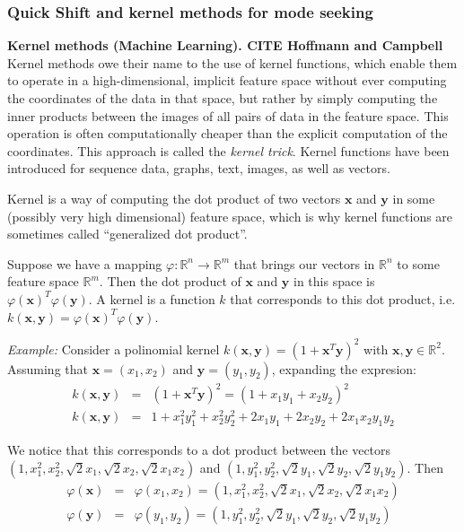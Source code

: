 \subsubsection{Quick Shift and kernel methods for mode seeking}
\begin{description}
 \item \textbf{Kernel methods (Machine Learning). CITE Hoffmann and Campbell } Kernel methods owe their name to the use of kernel functions, which enable them to operate in a high-dimensional, implicit feature space without ever computing the coordinates of the data in that space, but rather by simply computing the inner products between the images of all pairs of data in the feature space. This operation is often computationally cheaper than the explicit computation of the coordinates. This approach is called the \textit{kernel trick}. Kernel functions have been introduced for sequence data, graphs, text, images, as well as vectors.
 
 Kernel is a way of computing the dot product of two vectors $ \mathbf{x}$ and $ \mathbf{y}$ in some (possibly very high dimensional) feature space, which is why kernel functions are sometimes called ``generalized dot product''.

 Suppose we have a mapping $\varphi:\mathbb{R}^{n}\rightarrow \mathbb{R}^{m}$ that brings our vectors in $\mathbb{R}^{n}$ to some feature space $\mathbb{R}^{m}$. Then the dot product of $ \mathbf{x}$ and $ \mathbf{y}$ in this space is $\varphi( \mathbf{x})^{T}\varphi( \mathbf{y})$. A kernel is a function $k$ that corresponds to this dot product, i.e. $k( \mathbf{x}, \mathbf{y})=\varphi( \mathbf{x})^{T}\varphi( \mathbf{y})$.

 \textsl{Example:} Consider a polinomial kernel $k(\mathbf{x},\mathbf{y})=(1+ \mathbf{x}^{T} \mathbf{y})^{2}$ with $\mathbf{x},\mathbf{y} \in \mathbb{R}^{2}$. Assuming that $\mathbf{x}=(x_1, x_2)$ and $\mathbf{y}=(y_1, y_2)$, expanding the expresion: 
 \begin{eqnarray} 
   \nonumber
   k(\mathbf{x},\mathbf{y}) &=& (1+\mathbf{x}^{T}\mathbf{y})^{2}=(1+x_1y_1+x_2y_2)^2 \\ 
   \nonumber
   k(\mathbf{x},\mathbf{y}) &=& 1 + x_1^2y_1^2 + x_2^2y_2^2 + 2x_1y_1 + 2x_2y_2 + 2x_1x_2y_1y_2
 \end{eqnarray}

 We notice that this corresponds to a dot product between the vectors $(1, x_1^2, x_2^2, \sqrt{2}x_1,  \sqrt{2}x_2, \sqrt{2}x_1x_2)$ and $(1, y_1^2, y_2^2, \sqrt{2}y_1,  \sqrt{2}y_2, \sqrt{2}y_1y_2)$. Then  
 \begin{eqnarray} 
   \nonumber
   \varphi(\mathbf{x}) &=& \varphi(x_1, x_2) = (1, x_1^2, x_2^2, \sqrt{2}x_1,  \sqrt{2}x_2, \sqrt{2}x_1x_2) \\ 
   \nonumber
   \varphi(\mathbf{y}) &=& \varphi(y_1, y_2) = (1, y_1^2, y_2^2, \sqrt{2}y_1,  \sqrt{2}y_2, \sqrt{2}y_1y_2)
 \end{eqnarray}


\end{description}
